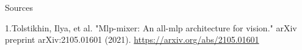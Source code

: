 \documentclass{beamer}
\begin{document}

\begin{frame}{Sources}
\begin{thebibliography}{0}

   1.Tolstikhin, Ilya, et al. "Mlp-mixer: An all-mlp architecture for vision." arXiv preprint arXiv:2105.01601 (2021). \url{https://arxiv.org/abs/2105.01601} 
  
\end{thebibliography}

\end{frame}

 
\end{document}
